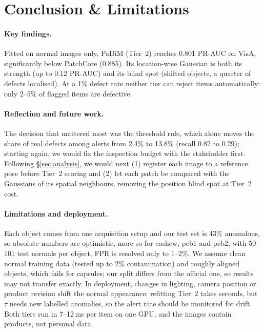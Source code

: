 \section{Conclusion \& Limitations}
\label{sec:conclusion}

\paragraph{Key findings.}
Fitted on normal images only, PaDiM (Tier~2) reaches 0.801 PR-AUC on VisA, significantly below
PatchCore (0.885).
Its location-wise Gaussian is both its strength (up to 0.12 PR-AUC) and its blind spot (shifted
objects, a quarter of defects localised).
At a 1\% defect rate neither tier can reject items automatically: only 2--5\% of flagged items are
defective.

\paragraph{Reflection and future work.}
The decision that mattered most was the threshold rule, which alone moves the share of real defects
among alerts from 2.4\% to 13.8\% (recall 0.82 to 0.29); starting again, we would fix the inspection
budget with the stakeholder first.
Following \S\ref{sec:analysis}, we would next (1) register each image to a reference pose before Tier~2
scoring and (2) let each patch be compared with the Gaussians of its spatial neighbours, removing the
position blind spot at Tier~2 cost.

\paragraph{Limitations and deployment.}
Each object comes from one acquisition setup and our test set is 43\% anomalous, so absolute numbers
are optimistic, more so for cashew, pcb1 and pcb2; with 50--101 test normals per object, FPR is
resolved only to 1--2\%.
We assume clean normal training data (tested up to 2\% contamination) and roughly aligned objects, which
fails for capsules; our split differs from the official one, so results may not transfer exactly.
In deployment, changes in lighting, camera position or product revision shift the normal appearance:
refitting Tier~2 takes seconds, but $\tau$ needs new labelled anomalies, so the alert rate should be
monitored for drift.
Both tiers run in 7--12\,ms per item on one GPU, and the images contain products, not personal data.
